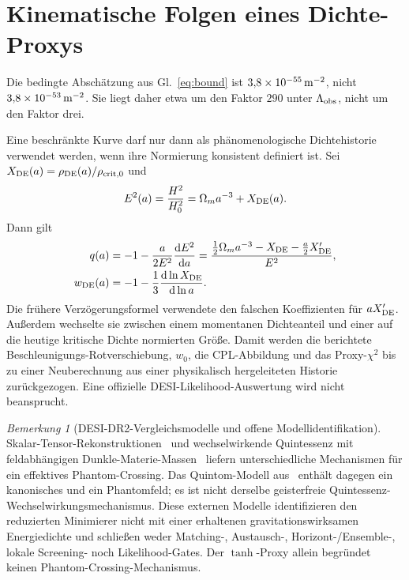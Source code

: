 \documentclass[12pt,a4paper]{article}
\theoremstyle{definition}
\theoremstyle{plain}
\theoremstyle{remark}
\newtheorem{remark}[definition]{Bemerkung}
\newcommand{\dd}{\mathrm{d}}
\begin{document}
\section{Kinematische Folgen eines Dichte-Proxys}\label{sec:observations}

Die bedingte Abschätzung aus Gl.~\eqref{eq:bound} ist
\(3{,}8\times10^{-55}\,{\rm m}^{-2}\), nicht
\(3{,}8\times10^{-53}\,{\rm m}^{-2}\). Sie liegt daher etwa um den Faktor
\(290\) unter \(\Lambda_{\rm obs}\), nicht um den Faktor drei.

Eine beschränkte Kurve darf nur dann als phänomenologische Dichtehistorie
verwendet werden, wenn ihre Normierung konsistent definiert ist. Sei
\(X_{\rm DE}(a)=\rho_{\rm DE}(a)/\rho_{\rm crit,0}\) und
\[
 E^2(a)=\frac{H^2}{H_0^2}=\Omega_ma^{-3}+X_{\rm DE}(a).
\]
Dann gilt
\begin{align}
 q(a)&=-1-\frac{a}{2E^2}\frac{\dd E^2}{\dd a}
 =\frac{\tfrac12\Omega_ma^{-3}-X_{\rm DE}
 -\tfrac a2X_{\rm DE}'}{E^2},\label{eq:q-correct}\\
 w_{\rm DE}(a)&=-1-\frac13\frac{\dd\ln X_{\rm DE}}{\dd\ln a}.
 \label{eq:weff}
\end{align}
Die frühere Verzögerungsformel verwendete den falschen Koeffizienten für
\(aX_{\rm DE}'\). Außerdem wechselte sie zwischen einem momentanen
Dichteanteil und einer auf die heutige kritische Dichte normierten Größe.
Damit werden die berichtete Beschleunigungs-Rotverschiebung, \(w_0\), die
CPL-Abbildung und das Proxy-\(\chi^2\) bis zu einer Neuberechnung aus einer
physikalisch hergeleiteten Historie zurückgezogen. Eine offizielle
DESI-Likelihood-Auswertung wird nicht beansprucht.

\begin{remark}[DESI-DR2-Vergleichsmodelle und offene Modellidentifikation]
Skalar-Tensor-Rekonstruktionen~\cite{Efstratiou2025} und wechselwirkende
Quintessenz mit feldabhängigen Dunkle-Materie-Massen~\cite{Antusch2026}
liefern unterschiedliche Mechanismen für ein effektives Phantom-Crossing.
Das Quintom-Modell aus~\cite{Sahoo2026} enthält dagegen ein kanonisches
und ein Phantomfeld; es ist nicht derselbe geisterfreie
Quintessenz-Wechselwirkungsmechanismus. Diese externen Modelle
identifizieren den reduzierten Minimierer nicht mit einer erhaltenen
gravitationswirksamen Energiedichte und schließen weder Matching-,
Austausch-, Horizont-/Ensemble-, lokale Screening- noch Likelihood-Gates.
Der $\tanh$-Proxy allein begründet keinen Phantom-Crossing-Mechanismus.
\end{remark}
\end{document}

